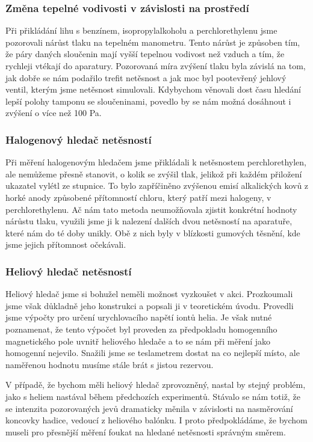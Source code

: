 \documentclass[english]{article}
\begin{document}
		\subsubsection{Změna tepelné vodivosti v závislosti na prostředí}
		 	Při přikládání lihu s benzínem, isopropylalkoholu a perchlorethylenu jsme pozorovali nárůst tlaku na tepelném manometru. Tento nárůst je způsoben tím, že páry daných sloučenin mají vyšší tepelnou vodivost než vzduch a tím, že rychleji vtékají do aparatury. Pozorovaná míra zvýšení tlaku byla závislá na tom, jak dobře se nám podařilo trefit netěsnost a jak moc byl pootevřený jehlový ventil, kterým jsme netěsnost simulovali. Kdybychom věnovali dost času hledání lepší polohy tamponu se sloučeninami, povedlo by se nám možná dosáhnout i zvýšení o více než 100 Pa.
		
		\subsubsection{Halogenový hledač netěsností}
			Při měření halogenovým hledačem jsme přikládali k netěsnostem perchlorethylen, ale nemůžeme přesně stanovit, o kolik se zvýšil tlak, jelikož při každém přiložení ukazatel vylétl ze stupnice. To bylo zapříčiněno zvýšenou emisí alkalických kovů z horké anody způsobené přítomností chloru, který patří mezi halogeny, v perchlorethylenu. Ač nám tato metoda neumožňovala zjistit konkrétní hodnoty nárůstu tlaku, využili jsme ji k nalezení dalších dvou netěsností na aparatuře, které nám do té doby unikly. Obě z nich byly v blízkosti gumových těsnění, kde jsme jejich přítomnost očekávali.
						
		\subsubsection{Heliový hledač netěsností}
			Heliový hledač jsme si bohužel neměli možnost vyzkoušet v akci. Prozkoumali jsme však důkladně jeho konstrukci a popsali ji v teoretickém úvodu. Provedli jsme výpočty pro určení urychlovacího napětí iontů helia. Je však nutné poznamenat, že tento výpočet byl proveden za předpokladu homogenního magnetického pole uvnitř heliového hledače a to se nám při měření jako homogenní nejevilo. Snažili jsme se teslametrem dostat na co nejlepší místo, ale naměřenou hodnotu musíme stále brát s jistou rezervou.
			
			V případě, že bychom měli heliový hledač zprovozněný, nastal by stejný problém, jako s heliem nastával během předchozích experimentů. Stávalo se nám totiž, že se intenzita pozorovaných jevů dramaticky měnila v závislosti na nasměrování koncovky hadice, vedoucí z heliového balónku. I proto předpokládáme, že bychom museli pro přesnější měření foukat na hledané netěsnosti správným směrem.
\end{document}
